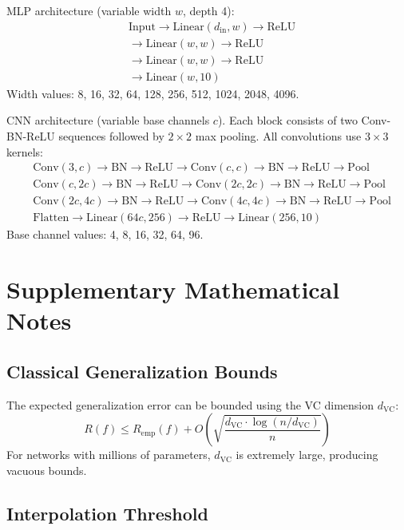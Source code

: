 \documentclass[conference]{IEEEtran}
\begin{document}
MLP architecture (variable width $w$, depth 4):
\begin{align*}
    &\text{Input} \to \text{Linear}(d_{\text{in}}, w) \to \text{ReLU} \\
    &\to \text{Linear}(w, w) \to \text{ReLU} \\
    &\to \text{Linear}(w, w) \to \text{ReLU} \\
    &\to \text{Linear}(w, 10)
\end{align*}
Width values: 8, 16, 32, 64, 128, 256, 512, 1024, 2048, 4096.

CNN architecture (variable base channels $c$). Each block consists of two Conv-BN-ReLU sequences followed by $2\times 2$ max pooling. All convolutions use $3\times 3$ kernels:
{\footnotesize
\begin{align*}
    &\text{Conv}(3,c) \!\to\! \text{BN} \!\to\! \text{ReLU} \!\to\! \text{Conv}(c,c) \!\to\! \text{BN} \!\to\! \text{ReLU} \!\to\! \text{Pool} \\
    &\text{Conv}(c,2c) \!\to\! \text{BN} \!\to\! \text{ReLU} \!\to\! \text{Conv}(2c,2c) \!\to\! \text{BN} \!\to\! \text{ReLU} \!\to\! \text{Pool} \\
    &\text{Conv}(2c,4c) \!\to\! \text{BN} \!\to\! \text{ReLU} \!\to\! \text{Conv}(4c,4c) \!\to\! \text{BN} \!\to\! \text{ReLU} \!\to\! \text{Pool} \\
    &\text{Flatten} \!\to\! \text{Linear}(64c, 256) \!\to\! \text{ReLU} \!\to\! \text{Linear}(256, 10)
\end{align*}}
Base channel values: 4, 8, 16, 32, 64, 96.

\section{Supplementary Mathematical Notes}

\subsection{Classical Generalization Bounds}

The expected generalization error can be bounded using the VC dimension $d_{\text{VC}}$:
\begin{equation}
    R(f) \leq R_{\text{emp}}(f) + O\!\left(\sqrt{\frac{d_{\text{VC}} \cdot \log(n / d_{\text{VC}})}{n}}\right)
\end{equation}
For networks with millions of parameters, $d_{\text{VC}}$ is extremely large, producing vacuous bounds.

\subsection{Interpolation Threshold}
\end{document}

